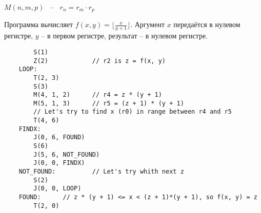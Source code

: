 \documentclass{article}
\begin{document}
	\hspace{30px}	$M(n, m, p)$ \ -- \ $r_n = r_m \cdot r_p$
	
	Программа вычисляет $f(x, y) = \lfloor \frac{x}{y+1} \rfloor$. Аргумент $x$ передаётся в нулевом регистре, $y$ -- в первом регистре, результат -- в нулевом регистре.
	
	\begin{lstlisting}
		S(1)
		Z(2)			// r2 is z = f(x, y)
	LOOP:
		T(2, 3)
		S(3)
		M(4, 1, 2)		// r4 = z * (y + 1)
		M(5, 1, 3)		// r5 = (z + 1) * (y + 1)
		// Let's try to find x (r0) in range between r4 and r5
		T(4, 6)
	FINDX:
		J(0, 6, FOUND)
		S(6)
		J(5, 6, NOT_FOUND)
		J(0, 0, FINDX)
	NOT_FOUND:			// Let's try whith next z
		S(2)
		J(0, 0, LOOP)
	FOUND:		// z * (y + 1) <= x < (z + 1)*(y + 1), so f(x, y) = z
		T(2, 0)
	\end{lstlisting}
	
	
	
\end{document}
